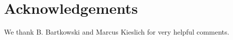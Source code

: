 \documentclass[version=3.21, pagesize, twoside=off, bibliography=totoc, DIV=calc, fontsize=12pt, a4paper, french, english]{scrartcl}
\newenvironment{acknowledgements}{
	\section*{Acknowledgements}
}{
}
\begin{document}

\begin{acknowledgements}
We thank B. Bartkowski and Marcus Kieslich for very helpful comments.
\end{acknowledgements}



\end{document}
